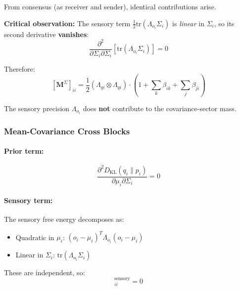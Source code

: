 \documentclass[12pt]{article}
\begin{document}
From consensus (as receiver and sender), identical contributions arise.

\textbf{Critical observation:} The sensory term $\frac{1}{2}\mathrm{tr}(\Lambda_{o_i}\Sigma_i)$ is \textit{linear} in $\Sigma_i$, so its second derivative \textbf{vanishes}:
\begin{equation}
\frac{\partial^2}{\partial \Sigma_i \partial \Sigma_i}\left[\mathrm{tr}(\Lambda_{o_i}\Sigma_i)\right] = 0
\end{equation}

Therefore:
\begin{equation}
\boxed{
[\mathbf{M}^\Sigma]_{ii} = \frac{1}{2}(\Lambda_{qi} \otimes \Lambda_{qi}) \cdot \left(1 + \sum_k \beta_{ik} + \sum_j \beta_{ji}\right)
}
\label{eq:mass_covariance}
\end{equation}

The sensory precision $\Lambda_{o_i}$ does \textbf{not} contribute to the covariance-sector mass.

\subsubsection{Mean-Covariance Cross Blocks}

\paragraph{Prior term:}
\begin{equation}
\frac{\partial^2 D_{\mathrm{KL}}(q_i \| p_i)}{\partial \mu_i \partial \Sigma_i} = 0
\end{equation}

\paragraph{Sensory term:} The sensory free energy decomposes as:
\begin{itemize}
    \item Quadratic in $\mu_i$: $(o_i - \mu_i)^T\Lambda_{o_i}(o_i - \mu_i)$
    \item Linear in $\Sigma_i$: $\mathrm{tr}(\Lambda_{o_i}\Sigma_i)$
\end{itemize}
These are independent, so:
\begin{equation}
[\mathbf{C}^{\mu\Sigma}]_{ii}^{\text{sensory}} = 0
\end{equation}
\end{document}
